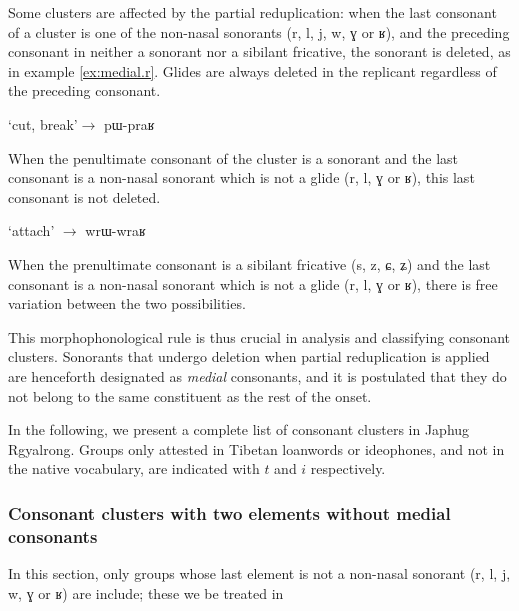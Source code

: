 \documentclass[oldfontcommands,oneside,a4paper,11pt]{article}
\newcommand{\ipa}[1]{{\phon #1}} %
\begin{document}
Some clusters are affected by the partial reduplication:   when the last consonant  of a cluster is one of the non-nasal sonorants (\ipa{r}, \ipa{l}, \ipa{j}, \ipa{w}, \ipa{ɣ} or \ipa{ʁ}), and the preceding consonant in neither a sonorant nor a sibilant fricative, the sonorant is deleted, as in example \ref{ex:medial.r}. Glides are always deleted in the replicant regardless of the preceding consonant.
 
 \begin{exe}
\ex \label{ex:medial.r}
\glt \ipa{praʁ} `cut, break'$\rightarrow$ \ipa{pɯ-praʁ}
\end{exe}

When the penultimate consonant of the cluster is a sonorant   and the last consonant is a non-nasal sonorant which is not a glide (\ipa{r}, \ipa{l}, \ipa{ɣ} or \ipa{ʁ}), this last consonant  is not deleted. 

 \begin{exe}
\ex  \label{ex:initial.r}
\glt \ipa{wraʁ} `attach' $\rightarrow$ \ipa{wrɯ-wraʁ}
\end{exe}
  
When the prenultimate consonant is a sibilant fricative   (\ipa{s}, \ipa{z}, \ipa{ɕ}, \ipa{ʑ}) and the last consonant is a non-nasal sonorant which is not a glide (\ipa{r}, \ipa{l}, \ipa{ɣ} or \ipa{ʁ}), there is   free variation between the two possibilities.

This morphophonological rule is thus crucial in analysis and classifying consonant clusters. Sonorants that undergo deletion when partial reduplication is applied are henceforth designated as \textit{medial} consonants, and it is postulated that they do not belong to the same constituent as the rest of the onset.

In the following, we present a complete list of consonant clusters in Japhug Rgyalrong. Groups only attested in Tibetan loanwords or ideophones, and not in the native vocabulary, are indicated with $t$ and $i$ respectively.
  
  
  \subsubsection{Consonant clusters with two elements without medial consonants}  
In this section, only groups whose last element is not a non-nasal sonorant (\ipa{r}, \ipa{l}, \ipa{j}, \ipa{w}, \ipa{ɣ} or \ipa{ʁ}) are include; these we be treated in
\end{document}
